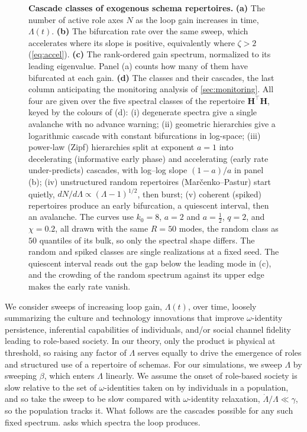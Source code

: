 \documentclass[
  aps,prx,
  reprint,
  superscriptaddress,
  nofootinbib,
  longbibliography
]{revtex4-2}
\begin{document}
\begin{figure}[t!]
\caption{\textbf{Cascade classes of exogenous schema repertoires.} \textbf{(a)} The number of active role axes $N$ as the loop gain increases in time, $\Lambda(t)$. \textbf{(b)} The bifurcation rate over the same sweep, which accelerates where its slope is positive, equivalently where $\zeta>2$ (\cref{eq:accel}). \textbf{(c)} The rank-ordered gain spectrum, normalized to its leading eigenvalue. Panel (a) counts how many of them have bifurcated at each gain. \textbf{(d)} The classes and their cascades, the last column anticipating the monitoring analysis of \cref{sec:monitoring}. All four are given over the five spectral classes of the repertoire $\bm{H}^{\!\top}\bm{H}$, keyed by the colours of (d): (i) degenerate spectra give a single avalanche with no advance warning; (ii) geometric hierarchies give a logarithmic cascade with constant bifurcations in log-space; (iii) power-law (Zipf) hierarchies split at exponent $a=1$ into decelerating (informative early phase) and accelerating (early rate under-predicts) cascades, with log--log slope $(1-a)/a$ in panel (b); (iv) unstructured random repertoires (Mar\v{c}enko--Pastur) start quietly, $dN/d\Lambda\propto(\Lambda-1)^{1/2}$, then burst; (v) coherent (spiked) repertoires produce an early bifurcation, a quiescent interval, then an avalanche. The curves use $k_0=8$, $a=2$ and $a=\tfrac12$, $q=2$, and $\chi=0.2$, all drawn with the same $R=50$ modes, the random class as $50$ quantiles of its bulk, so only the spectral shape differs. The random and spiked classes are single realizations at a fixed seed. The quiescent interval reads out the gap below the leading mode in (c), and the crowding of the random spectrum against its upper edge makes the early rate vanish.}
\label{fig:classes}
\end{figure}

\noindent We consider sweeps of increasing loop gain, $\Lambda(t)$, over time, loosely summarizing the culture and technology innovations that improve $\omega$-identity persistence, inferential capabilities of individuals, and/or social channel fidelity leading to role-based society.
In our theory, only the product is physical at threshold, so raising any factor of $\Lambda$ serves equally to drive the emergence of roles and structured use of a repertoire of schemas. For our simulations, we sweep $\Lambda$ by sweeping $\beta$, which enters $\Lambda$ linearly. We assume the onset of role-based society is slow relative to the set of $\omega$-identities taken on by individuals in a population, and so take the sweep to be slow compared with $\omega$-identity relaxation, $\dot\Lambda/\Lambda\ll\gamma$, so the population tracks it. What follows are the cascades possible for any such fixed spectrum.  asks which spectra the loop produces.
\end{document}
